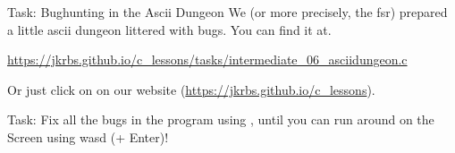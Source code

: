 \documentclass[10pt,graphics,aspectratio=169,table]{beamer}
\begin{document}
\begin{frame}[fragile]{Task: Bughunting in the Ascii Dungeon}
    We (or more precisely, the fsr) prepared a little ascii dungeon
    littered with bugs. You can find it at. 

    \small
    \url{https://jkrbs.github.io/c_lessons/tasks/intermediate_06_asciidungeon.c}
    
    Or just click on 
    on our website (\url{https://jkrbs.github.io/c_lessons}).


    Task: Fix all the bugs in the program using , until you can
    run around on the Screen using wasd (+ Enter)! 
\end{frame}
\end{document}
